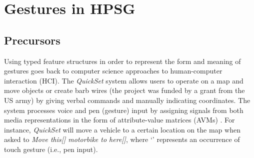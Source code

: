 \documentclass[output=paper]{langsci/langscibook}
\begin{document}
\section{Gestures in HPSG}
\label{sec:gestures-hpsg}


\subsection{Precursors} 
\label{sec:precursors}

Using typed feature structures in order to represent the form and meaning of gestures goes back to computer science approaches to human-computer interaction (HCI). %
%
The \textit{QuickSet} system \citep{Cohen:et:al:1997} allows users to operate on a map and move objects or create barb wires (the project was funded by a grant from the US army) by giving verbal commands and manually indicating coordinates.
%
The system processes voice and pen (gesture) input by assigning signals from both media representations in the form of attribute-value matrices (AVMs) \citep{Johnston:1998,Johnston:et:al:1997}.
%
%
For instance, \textit{QuickSet} will move a vehicle to a certain location on the map when asked to \textit{Move this[\Pointing] motorbike to here[\Pointing]}, where \enquote*{\Pointing} represents an occurrence of touch gesture (i.e., pen input). 
\end{document}
